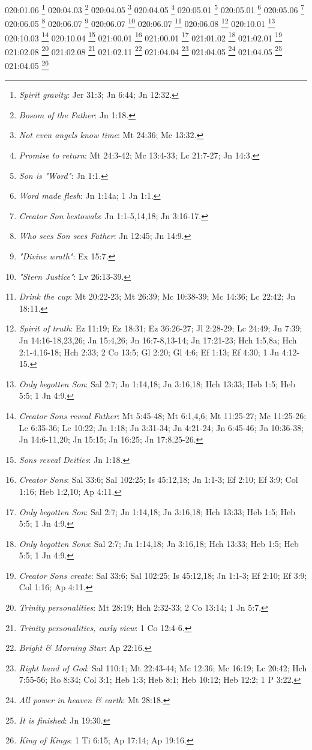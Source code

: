 {{{{{{{{{{{{{{{{{{{020:01.06 \footnote{\textit{Spirit gravity}: Jer 31:3; Jn 6:44; Jn 12:32.}
020:04.03 \footnote{\textit{Bosom of the Father}: Jn 1:18.}
020:04.05 \footnote{\textit{Not even angels know time}: Mt 24:36; Mc 13:32.}
020:04.05 \footnote{\textit{Promise to return}: Mt 24:3-42; Mc 13:4-33; Lc 21:7-27; Jn 14:3.}
020:05.01 \footnote{\textit{Son is "Word"}: Jn 1:1.}
020:05.01 \footnote{\textit{Word made flesh}: Jn 1:14a; 1 Jn 1:1.}
020:05.06 \footnote{\textit{Creator Son bestowals}: Jn 1:1-5,14,18; Jn 3:16-17.}
020:06.05 \footnote{\textit{Who sees Son sees Father}: Jn 12:45; Jn 14:9.}
020:06.07 \footnote{\textit{"Divine wrath"}: Ex 15:7.}
020:06.07 \footnote{\textit{"Stern Justice"}: Lv 26:13-39.}
020:06.07 \footnote{\textit{Drink the cup}: Mt 20:22-23; Mt 26:39; Mc 10:38-39; Mc 14:36; Lc 22:42; Jn 18:11.}
020:06.08 \footnote{\textit{Spirit of truth}: Ez 11:19; Ez 18:31; Ez 36:26-27; Jl 2:28-29; Lc 24:49; Jn 7:39; Jn 14:16-18,23,26; Jn 15:4,26; Jn 16:7-8,13-14; Jn 17:21-23; Hch 1:5,8a; Hch 2:1-4,16-18; Hch 2:33; 2 Co 13:5; Gl 2:20; Gl 4:6; Ef 1:13; Ef 4:30; 1 Jn 4:12-15.}
020:10.01 \footnote{\textit{Only begotten Son}: Sal 2:7; Jn 1:14,18; Jn 3:16,18; Hch 13:33; Heb 1:5; Heb 5:5; 1 Jn 4:9.}
020:10.03 \footnote{\textit{Creator Sons reveal Father}: Mt 5:45-48; Mt 6:1,4,6; Mt 11:25-27; Mc 11:25-26; Lc 6:35-36; Lc 10:22; Jn 1:18; Jn 3:31-34; Jn 4:21-24; Jn 6:45-46; Jn 10:36-38; Jn 14:6-11,20; Jn 15:15; Jn 16:25; Jn 17:8,25-26.}
020:10.04 \footnote{\textit{Sons reveal Deities}: Jn 1:18.}
021:00.01 \footnote{\textit{Creator Sons}: Sal 33:6; Sal 102:25; Is 45:12,18; Jn 1:1-3; Ef 2:10; Ef 3:9; Col 1:16; Heb 1:2,10; Ap 4:11.}
021:00.01 \footnote{\textit{Only begotten Son}: Sal 2:7; Jn 1:14,18; Jn 3:16,18; Hch 13:33; Heb 1:5; Heb 5:5; 1 Jn 4:9.}
021:01.02 \footnote{\textit{Only begotten Sons}: Sal 2:7; Jn 1:14,18; Jn 3:16,18; Hch 13:33; Heb 1:5; Heb 5:5; 1 Jn 4:9.}
021:02.01 \footnote{\textit{Creator Sons create}: Sal 33:6; Sal 102:25; Is 45:12,18; Jn 1:1-3; Ef 2:10; Ef 3:9; Col 1:16; Ap 4:11.}
021:02.08 \footnote{\textit{Trinity personalities}: Mt 28:19; Hch 2:32-33; 2 Co 13:14; 1 Jn 5:7.}
021:02.08 \footnote{\textit{Trinity personalities, early view}: 1 Co 12:4-6.}
021:02.11 \footnote{\textit{Bright & Morning Star}: Ap 22:16.}
021:04.04 \footnote{\textit{Right hand of God}: Sal 110:1; Mt 22:43-44; Mc 12:36; Mc 16:19; Lc 20:42; Hch 7:55-56; Ro 8:34; Col 3:1; Heb 1:3; Heb 8:1; Heb 10:12; Heb 12:2; 1 P 3:22.}
021:04.05 \footnote{\textit{All power in heaven & earth}: Mt 28:18.}
021:04.05 \footnote{\textit{It is finished}: Jn 19:30.}
021:04.05 \footnote{\textit{King of Kings}: 1 Ti 6:15; Ap 17:14; Ap 19:16.}
}}}}}}}}}}}}}}}}}}}
